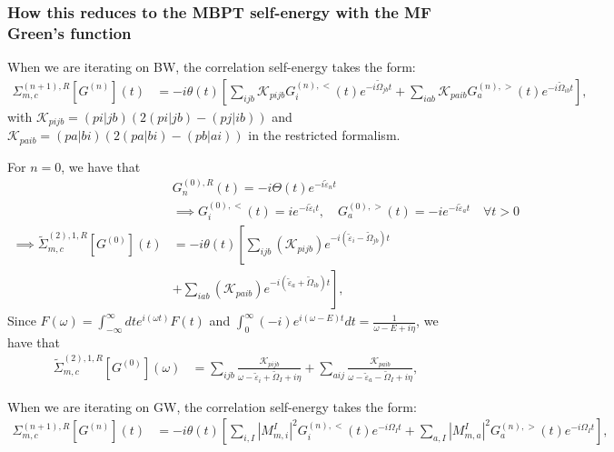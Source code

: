 \subsubsection{How this reduces to the MBPT self-energy with the MF Green's function}
When we are iterating on BW, the correlation self-energy takes the form: 
\begin{align}
\Sigma_{m, c}^{(n+1),R}[G^{(n)}](t) &= -i\theta(t)\left[\sum_{ijb}\mathcal{K}_{pijb} G^{(n),<}_{i}(t) e^{-i\tilde{\Omega}_{jb} t} + \sum_{iab}\mathcal{K}_{paib} G^{(n),>}_{a}(t) e^{-i\tilde{\Omega}_{ib} t}\right],
\label{eq:correlation_self_energy_bw}
\end{align}
with $\mathcal{K}_{pijb} = (pi|jb)\left(2(pi|jb)-(pj|ib)\right)$ and $\mathcal{K}_{paib} = (pa|bi)\left(2(pa|bi) - (pb|ai)\right)$ in the restricted formalism.
\begin{tcolorbox}[colback=red!5!white, colframe=red!75!black, title=How this reduces to the BWs2 self-energy with a HF Green's function]
For $n=0$, we have that
\begin{align}
    &G^{(0),R}_{n}(t)=-i\Theta(t)e^{-i\tilde{\varepsilon}_nt}\\
&\implies G^{(0),<}_{i}(t)=ie^{-i\tilde{\varepsilon}_i t}, \quad G^{(0),>}_{a}(t)=-ie^{-i\tilde{\varepsilon}_a t} \quad \forall t>0\\
\implies \tilde{\Sigma}_{m, c}^{(2),1,R}[G^{(0)}](t)&=-i\theta(t)\left[\sum_{ijb}\left(\mathcal{K}_{pijb}\right) e^{-i(\tilde{\varepsilon}_i-\tilde{\Omega}_{jb}) t}\right.\\
&\left. + \sum_{iab}\left( \mathcal{K}_{paib}\right) e^{-i(\tilde{\varepsilon}_a+\tilde{\Omega}_{ib}) t}\right],
\end{align}
Since $F(\omega) = \int_{-\infty}^{\infty} dt e^{i(\omega t)} F(t)$ and $\int_{0}^{\infty} (-i) e^{i(\omega -E) t} dt = \frac{1}{\omega - E + i\eta}$, we have that
\begin{align}
    \tilde{\Sigma}_{m, c}^{(2),1,R}[G^{(0)}](\omega) &= \sum_{ijb}\frac{\mathcal{K}_{pijb}}{\omega - \tilde{\varepsilon}_i+\tilde{\Omega}_I + i\eta} + \sum_{aij}\frac{\mathcal{K}_{paib}}{\omega - \tilde{\varepsilon}_a-\tilde{\Omega}_I + i\eta},
\end{align}
\end{tcolorbox}
When we are iterating on GW, the correlation self-energy takes the form:
\begin{align}
\Sigma_{m, c}^{(n+1),R}[G^{(n)}](t) &= -i\theta(t)\left[\sum_{i, I}\left|M_{ m,i}^I\right|^2 G^{(n),<}_{i}(t) e^{-i\Omega_I t} + \sum_{a, I}\left|M_{ m,a}^I\right|^2 G^{(n),>}_{a}(t) e^{-i\Omega_I t}\right],
\label{eq:correlation_self_energy_gw}
\end{align}
